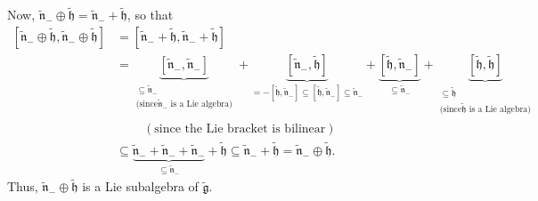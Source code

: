 \documentclass[etingof-lie.tex]{subfiles}
\begin{document}
\begin{vershort}
Now, $\widetilde{\mathfrak{n}}_{-}\oplus\widetilde{\mathfrak{h}}%
=\widetilde{\mathfrak{n}}_{-}+\widetilde{\mathfrak{h}}$, so that%
\begin{align*}
\left[  \widetilde{\mathfrak{n}}_{-}\oplus\widetilde{\mathfrak{h}%
},\widetilde{\mathfrak{n}}_{-}\oplus\widetilde{\mathfrak{h}}\right]   &
=\left[  \widetilde{\mathfrak{n}}_{-}+\widetilde{\mathfrak{h}}%
,\widetilde{\mathfrak{n}}_{-}+\widetilde{\mathfrak{h}}\right] \\
&  =\underbrace{\left[  \widetilde{\mathfrak{n}}_{-},\widetilde{\mathfrak{n}%
}_{-}\right]  }_{\substack{\subseteq\widetilde{\mathfrak{n}}_{-}\\\text{(since
}\widetilde{\mathfrak{n}}_{-}\text{ is a Lie algebra)}}}+\underbrace{\left[
\widetilde{\mathfrak{n}}_{-},\widetilde{\mathfrak{h}}\right]  }_{=-\left[
\widetilde{\mathfrak{h}},\widetilde{\mathfrak{n}}_{-}\right]  \subseteq\left[
\widetilde{\mathfrak{h}},\widetilde{\mathfrak{n}}_{-}\right]  \subseteq
\widetilde{\mathfrak{n}}_{-}}+\underbrace{\left[  \widetilde{\mathfrak{h}%
},\widetilde{\mathfrak{n}}_{-}\right]  }_{\subseteq\widetilde{\mathfrak{n}%
}_{-}}+\underbrace{\left[  \widetilde{\mathfrak{h}},\widetilde{\mathfrak{h}%
}\right]  }_{\substack{\subseteq\widetilde{\mathfrak{h}}\\\text{(since
}\widetilde{\mathfrak{h}}\text{ is a Lie algebra)}}}\\
&  \ \ \ \ \ \ \ \ \ \ \left(  \text{since the Lie bracket is bilinear}\right)
\\
&  \subseteq\underbrace{\widetilde{\mathfrak{n}}_{-}+\widetilde{\mathfrak{n}%
}_{-}+\widetilde{\mathfrak{n}}_{-}}_{\subseteq\widetilde{\mathfrak{n}}_{-}%
}+\widetilde{\mathfrak{h}}\subseteq\widetilde{\mathfrak{n}}_{-}%
+\widetilde{\mathfrak{h}}=\widetilde{\mathfrak{n}}_{-}\oplus
\widetilde{\mathfrak{h}}.
\end{align*}
Thus, $\widetilde{\mathfrak{n}}_{-}\oplus\widetilde{\mathfrak{h}}$ is a Lie
subalgebra of $\widetilde{\mathfrak{g}}$.
\end{vershort}
\end{document}
